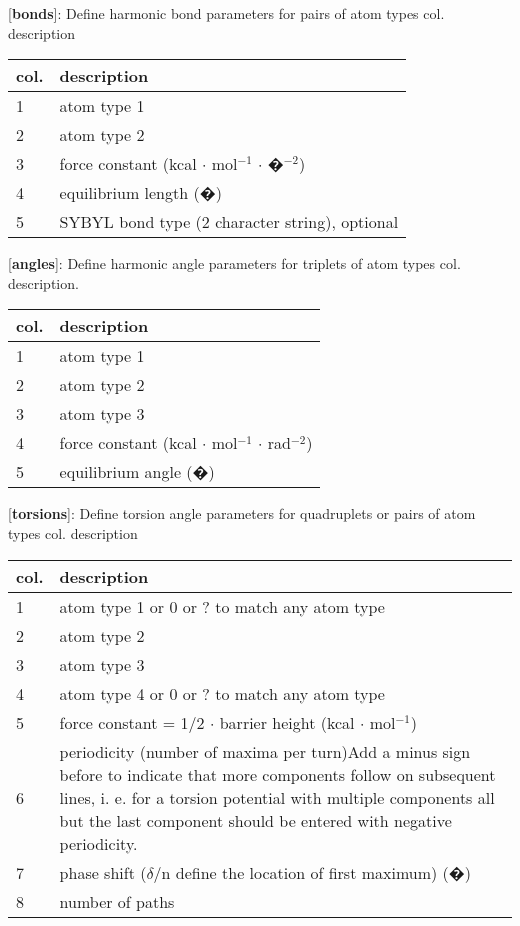 \documentclass[a4paper,10pt]{article}
\begin{document}
[\textbf{bonds}]: Define harmonic bond parameters for pairs of
atom types col. description \\
\begin{tabularx}{\textwidth}{|l|X|}
\hline \bf{col.} & \bf{description} \\
\hline 1 &  atom type 1\\
\hline 2 &  atom type 2 \\
\hline 3 & force constant (kcal $\cdot$ mol$^{-1}$ $\cdot$ �$^{-2}$) \\
\hline 4 & equilibrium length (�) \\
\hline 5 & SYBYL bond type (2 character string), optional \\
\hline
\end{tabularx}

[\textbf{angles}]: Define harmonic angle parameters for triplets
of atom types col. description.\\
\begin{tabularx}{\textwidth}{|l|X|}
\hline \bf{col.} & \bf{description} \\
\hline 1 & atom type 1 \\
\hline 2  & atom type 2 \\
\hline 3 & atom type 3 \\
\hline 4 & force constant (kcal $\cdot$ mol$^{-1}$ $\cdot$ rad$^{-2}$) \\
\hline 5 & equilibrium angle (�)\\
\hline
\end{tabularx}

[\textbf{torsions}]: Define torsion angle parameters for
quadruplets or pairs of atom types col. description \\
\begin{tabularx}{\textwidth}{|l|X|}
\hline \bf{col.} & \bf{description} \\
\hline 1  & atom type 1 or 0 or ? to match any atom type \\
\hline 2 & atom type 2 \\
\hline 3 & atom type 3 \\
\hline 4 & atom type 4 or 0 or ? to match any atom type \\
\hline 5  & force constant = 1/2 $\cdot$ barrier height (kcal $\cdot$ mol$^{-1}$) \\
\hline 6 & periodicity (number of maxima per turn)Add a minus sign
before to indicate that more components follow on subsequent
lines, i. e. for a torsion potential with multiple components all
but the last
component should be entered with negative periodicity. \\
\hline 7  & phase shift ($\delta$/n define the location of first maximum) (�) \\
\hline 8 & number of paths \\
\hline
\end{tabularx}
\end{document}
